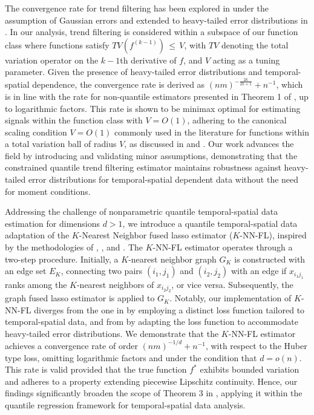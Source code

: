\documentclass[twoside,11pt]{article}
\begin{document}
The convergence rate for trend filtering has been explored in \cite{guntuboyina2020adaptive, tibshirani2014adaptive, wang2015trend, padilla2023temporal} under the assumption of Gaussian errors and extended to heavy-tailed error distributions in \cite{madrid2022risk,zhang2023risk}. In our analysis, trend filtering is considered within a subspace of our function class where functions satisfy \(TV(f^{(k-1)}) \,\leq\, V\), with \(TV\) denoting the total variation operator on the \(k-1\)th derivative of \(f\), and \(V\) acting as a tuning parameter. Given the presence of heavy-tailed error distributions and temporal-spatial dependence, the convergence rate is derived as \((nm)^{-\frac{2k}{2k+1}} + n^{-1}\), which is in line with the rate for non-quantile estimators presented in Theorem 1 of \cite{padilla2023temporal}, up to logarithmic factors. This rate is shown to be minimax optimal for estimating signals within the function class with \(V = O(1)\), adhering to the canonical scaling condition \(V = O(1)\) commonly used in the literature for functions within a total variation ball of radius \(V\), as discussed in \cite{madrid2022risk} and \cite{sadhanala2016total}. Our work advances the field by introducing and validating minor assumptions, demonstrating that the constrained quantile trend filtering estimator maintains robustness against heavy-tailed error distributions for temporal-spatial dependent data without the need for moment conditions.


Addressing the challenge of nonparametric quantile temporal-spatial data estimation for dimensions \(d > 1\), we introduce a quantile temporal-spatial data adaptation of the \(K\)-Nearest Neighbor fused lasso estimator (\(K\)-NN-FL), inspired by the methodologies of \cite{elmoataz2008nonlocal}, \cite{ferradans2014regularized}, and \cite{madrid2022risk}. The \(K\)-NN-FL estimator operates through a two-step procedure. Initially, a \(K\)-nearest neighbor graph \(G_K\) is constructed with an edge set \(E_K\), connecting two pairs \( (i_1, j_1) \) and \( (i_2, j_2) \) with an edge if \( x_{i_1 j_1} \) ranks among the \(K\)-nearest neighbors of \( x_{i_2 j_2} \), or vice versa. Subsequently, the graph fused lasso estimator is applied to \(G_K\). Notably, our implementation of \(K\)-NN-FL diverges from the one in \cite{madrid2020adaptive} by employing a distinct loss function tailored to temporal-spatial data, and from \cite{padilla2023temporal} by adapting the loss function to accommodate heavy-tailed error distributions. We demonstrate that the \(K\)-NN-FL estimator achieves a convergence rate of order \((nm)^{-1/d} + n^{-1}\), with respect to the Huber type loss, omitting logarithmic factors and under the condition that \(d = o(n)\). This rate is valid provided that the true function \(f^*\) exhibits bounded variation and adheres to a property extending piecewise Lipschitz continuity. Hence, our findings significantly broaden the scope of Theorem 3 in \cite{padilla2023temporal}, applying it within the quantile regression framework for temporal-spatial data analysis.
\end{document}
